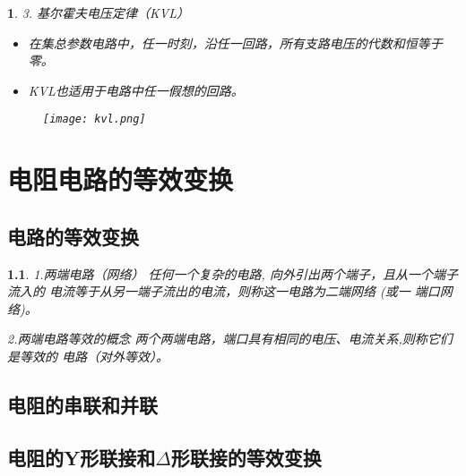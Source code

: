 \documentclass[UTF8]{report}
\theoremstyle{MyLineTheoremStyle} %
\theoremstyle{MyBlockTheoremStyle} %
\theoremstyle{MySubsubsectionStyle} %
\newtheorem{definition}{}
\begin{document}
\begin{definition}
    3. 基尔霍夫电压定律（KVL）
    \begin{itemize}
        \item 在集总参数电路中，任一时刻，沿任一回路，所有支路电压的代数和恒等于零。
        \item KVL也适用于电路中任一假想的回路。
    \end{itemize}
    \begin{figure}[ht]
        \centering
        \texttt{[image: kvl.png]}
    \end{figure}
\end{definition}


\chapter{电阻电路的等效变换}

\section{电路的等效变换}

\begin{definition}
    1.两端电路（网络）
    任何一个复杂的电路, 向外引出两个端子，且从一个端子流入的
电流等于从另一端子流出的电流，则称这一电路为二端网络 (或一
端口网络)。

2.两端电路等效的概念
两个两端电路，端口具有相同的电压、电流关系,则称它们是等效的
电路（对外等效）。
\end{definition}

\section{电阻的串联和并联}

\section{电阻的Y形联接和$\Delta$形联接的等效变换}
\end{document}
